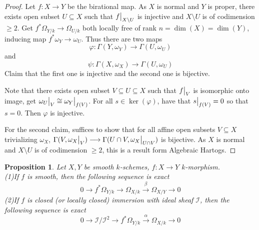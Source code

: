 \documentclass{ctexart}
\newtheorem{proposition}{Proposition}[section]
\begin{document}
\begin{proof}
    Let $f: X \longrightarrow Y$ be the birational map.
    As $X$ is normal and $Y$ is proper, there exists open subset $U \subseteq X$ such that $f\big{|}_{X \setminus U}$ is injective and $X \setminus U$ is of codimension $\ge 2$.
    Get $f^{\ast}\Omega_{Y/k} \longrightarrow \Omega_{U/k}$ both locally free of rank $n = \dim(X) = \dim(Y)$, inducing map $f^{\ast}\omega_{Y} \longrightarrow \omega_{U}$.
    Thus there are two maps
    \begin{equation*}
        \varphi: \Gamma(Y, \omega_{Y}) \longrightarrow \Gamma(U, \omega_{U})
    \end{equation*} 
    and 
    \begin{equation*}
        \psi: \Gamma(X, \omega_{X}) \longrightarrow \Gamma(U, \omega_{U})
    \end{equation*}
    Claim that the first one is injective and the second one is bijective.
    \par
    Note that there exists open subset $V \subseteq U \subseteq X$ such that $f\big{|}_{V}$ is isomorphic onto image, get $\omega_{U}\big{|}_{V} \cong \omega_{Y}\big{|}_{f(V)}$.
    For all $s\in \ker(\varphi)$, have that $s\big{|}_{f(V)} = 0$ so that $s = 0$.
    Then $\varphi$ is injective.
    \par
    For the second claim, suffices to show that for all affine open subsets $V \subseteq X$ trivializing $\omega_{X}$, $\Gamma(V, \omega_{X}\big{|}_{V}) \longrightarrow \Gamma(U \cap V, \omega_{X}\big{|}_{U \cap V})$ is bijective.
    As $X$ is normal and $X \setminus U$ is of codimension $\ge 2$, this is a result form Algebraic Hartogs.
\end{proof}
\begin{proposition}
    Let $X,Y$ be smooth $k$-schemes, $f: X \longrightarrow Y$ $k$-morphism. \\
    (1)If $f$ is smooth, then the following sequence is exact
    \begin{equation*}
        0 \longrightarrow f^{\ast}\Omega_{Y/k} \longrightarrow \Omega_{X/k} \overset{\beta}{\longrightarrow} \Omega_{X/Y} \longrightarrow 0
    \end{equation*}
    (2)If $f$ is closed (or locally closed) immersion with ideal sheaf $\mathcal{I}$,
    then the following sequence is exact
    \begin{equation*}
        0 \longrightarrow \mathcal{I}/\mathcal{I}^{2} \longrightarrow f^{\ast}\Omega_{Y/k} \overset{\alpha}{\longrightarrow} \Omega_{X/k} \longrightarrow 0 
    \end{equation*}
    \label{Proposition 9.9}
\end{proposition}
\end{document}
